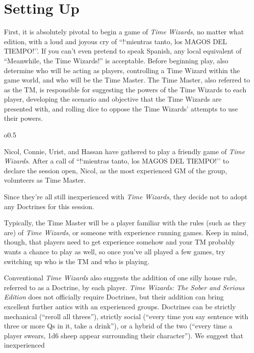 \documentclass[twoside]{article}
\newcommand{\mientrastanto}{``!`mientras tanto, los MAGOS DEL TIEMPO!''}
\newcommand{\twsse}{\emph{Time Wizards: The Sober and Serious Edition}}
\newcommand{\tw}{\emph{Time Wizards}}
\newenvironment{examplebox}[1]{\begin{tcolorbox}[colback=green!5!white,colframe=green!75!black,title={Example: #1}]}{\end{tcolorbox}\vspace{-30pt}}
\begin{document}
\section{Setting Up} \label{sec:setup}
First, it is absolutely pivotal to begin a game of \tw{}, no matter what edition, with a loud
and joyous cry of \mientrastanto. If you can't even pretend to speak Spanish, any local
equivalent of ``Meanwhile, the Time Wizards!'' is acceptable. Before beginning play, also
determine who will be acting as players, controlling a Time Wizard within the game world, and
who will be the Time Master. The Time Master, also referred to as the TM, is responsible for
suggesting the powers of the Time Wizards to each player, developing the scenario and objective
that the Time Wizards are presented with, and rolling dice to oppose the Time Wizards' attempts
to use their powers.

\begin{wrapfigure}{o}{0.5\textwidth}
   \begin{examplebox}{Beginning Play}
      Nicol, Connie, Urist, and Hassan have gathered to play a friendly game of \tw{}. After a
      call of \mientrastanto{} to declare the session open, Nicol, as the most experienced GM of
      the group, volunteers as Time Master.

      Since they're all still inexperienced with \tw{}, they decide not to adopt any Doctrines
      for this session.
   \end{examplebox}
   \vspace{15pt}
\end{wrapfigure}

Typically, the Time Master will be a player familiar with the rules (such as they are) of \tw{},
or someone with experience running games. Keep in mind, though, that players need to get
experience somehow and your TM probably wants a chance to play as well, so once you've all played
a few games, try switching up who is the TM and who is playing.

Conventional \tw{} also suggests the addition of one silly house rule, referred to as a Doctrine,
by each player. \twsse{} does not officially require Doctrines, but their addition can bring
excellent further antics with an experienced groups. Doctrines can be strictly mechanical
(``reroll all threes''), strictly social (``every time you say sentence with three or more Qs
in it, take a drink''), or a hybrid of the two (``every time a player swears, 1d6 sheep appear
surrounding their character''). We suggest that inexperienced
\end{document}
